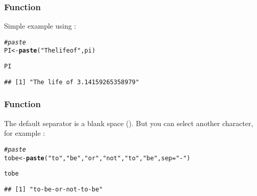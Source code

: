 \documentclass[12pt]{beamer}\usepackage[]{graphicx}\usepackage[]{color}
\makeatletter
\newcommand{\hlstr}[1]{\textcolor[rgb]{0.192,0.494,0.8}{#1}}%
\newcommand{\hlcom}[1]{\textcolor[rgb]{0.678,0.584,0.686}{\textit{#1}}}%
\newcommand{\hlstd}[1]{\textcolor[rgb]{0.345,0.345,0.345}{#1}}%
\newcommand{\hlkwb}[1]{\textcolor[rgb]{0.69,0.353,0.396}{#1}}%
\newcommand{\hlkwc}[1]{\textcolor[rgb]{0.333,0.667,0.333}{#1}}%
\newcommand{\hlkwd}[1]{\textcolor[rgb]{0.737,0.353,0.396}{\textbf{#1}}}%
\newenvironment{kframe}{%
 \def\at@end@of@kframe{}%
 \ifinner\ifhmode%
  \def\at@end@of@kframe{\end{minipage}}%
  \begin{minipage}{\columnwidth}%
 \fi\fi%
 \def\FrameCommand##1{\hskip\@totalleftmargin \hskip-\fboxsep
 \colorbox{shadecolor}{##1}\hskip-\fboxsep
     \hskip-\linewidth \hskip-\@totalleftmargin \hskip\columnwidth}%
 \MakeFramed {\advance\hsize-\width
   \@totalleftmargin\z@ \linewidth\hsize
   \@setminipage}}%
 {\par\unskip\endMakeFramed%
 \at@end@of@kframe}
\newenvironment{knitrout}{}{} %
\makeatother
\begin{document}

\begin{frame}[fragile]
\frametitle{Function }

Simple example using :
\begin{knitrout}\footnotesize
{}\color{fgcolor}\begin{kframe}
\begin{alltt}
\hlcom{# paste}
\hlstd{PI} \hlkwb{<-} \hlkwd{paste}\hlstd{(}\hlstr{"The life of"}\hlstd{, pi)}

\hlstd{PI}
\end{alltt}
\begin{verbatim}
## [1] "The life of 3.14159265358979"
\end{verbatim}
\end{kframe}
\end{knitrout}

\end{frame}


\begin{frame}[fragile]
\frametitle{Function }

The default separator is a blank space (). But you can select another character, for example :
\begin{knitrout}\footnotesize
{}\color{fgcolor}\begin{kframe}
\begin{alltt}
\hlcom{# paste}
\hlstd{tobe} \hlkwb{<-} \hlkwd{paste}\hlstd{(}\hlstr{"to"}\hlstd{,} \hlstr{"be"}\hlstd{,} \hlstr{"or"}\hlstd{,} \hlstr{"not"}\hlstd{,} \hlstr{"to"}\hlstd{,} \hlstr{"be"}\hlstd{,} \hlkwc{sep} \hlstd{=} \hlstr{"-"}\hlstd{)}

\hlstd{tobe}
\end{alltt}
\begin{verbatim}
## [1] "to-be-or-not-to-be"
\end{verbatim}
\end{kframe}
\end{knitrout}

\end{frame}

\end{document}
